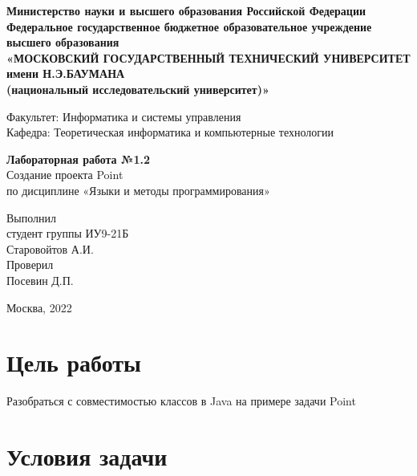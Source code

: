 \documentclass[12pt,a4paper,oneside,titlepage]{article}
\begin{document}
\begin{center}
  \hfill \break
  \textbf{
    \footnotesize{Министерство науки и высшего образования Российской Федерации}\\
    \hfill \break
    \footnotesize{Федеральное государственное бюджетное образовательное учреждение высшего образования}\\
    \small{«МОСКОВСКИЙ ГОСУДАРСТВЕННЫЙ ТЕХНИЧЕСКИЙ УНИВЕРСИТЕТ имени Н.Э.БАУМАНА\\(национальный исследовательский университет)»}}\\
\end{center}
\hfill \break
\normalsize{Факультет: Информатика и системы управления}\\
\hfill \break
\normalsize{Кафедра: Теоретическая информатика и компьютерные технологии}\\
\hfill\break
\begin{center}
  \textbf{\large{Лабораторная работа №1.2}}\\
  \large{Создание проекта Point\\
    по дисциплине «Языки и методы программирования»}\\
\end{center}
\hfill \break
\hfill \break
\hfill \break
\begin{flushright}
  \normalsize{
    Выполнил\\
    студент группы ИУ9-21Б\\
    Старовойтов А.И.\\
  }
  \normalsize{
    Проверил\\
    Посевин Д.П.
  }
\end{flushright}
\hfill \break
\hfill \break
\hfill \break
\hfill \break
\hfill \break
\hfill \break
\hfill \break
\hfill \break

\begin{center} Москва, 2022 \end{center}
\thispagestyle{empty} %

\author{Старовойтов Александр}

\section{Цель работы}

Разобраться с совместимостью классов в Java на примере задачи Point

\section{Условия задачи}
\end{document}
